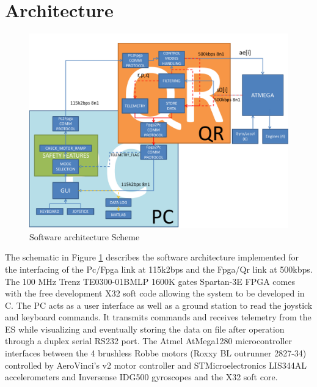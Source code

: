 \documentclass{article}
\begin{document}

\section{Architecture}
\label{sec:architecture}

\begin{figure}[h]
\centering
	\includegraphics[scale = .55]{Figures/Architecture.pdf}
	\caption{Software architecture Scheme}
	\label{fig.Architecture}
\end{figure}

The schematic in Figure \ref{fig.Architecture} describes the software architecture implemented for the interfacing of the Pc/Fpga link at 115k2bps and the Fpga/Qr link at 500kbps. The 100 MHz Trenz TE0300-01BMLP 1600K gates Spartan-3E FPGA comes with the free development X32 soft code allowing the system to be developed in C. The PC acts as a user interface as well as a ground station to read the joystick and keyboard commands. It transmits commands and receives telemetry from the ES while visualizing and eventually storing the data on file after operation through a duplex serial RS232 port. The Atmel AtMega1280 microcontroller interfaces between the 4 brushless Robbe motors (Roxxy BL outrunner 2827-34) controlled by AeroVinci's v2 motor controller and STMicroelectronics LIS344AL accelerometers and Inversense IDG500 gyroscopes and the X32 soft core. 
\end{document}
